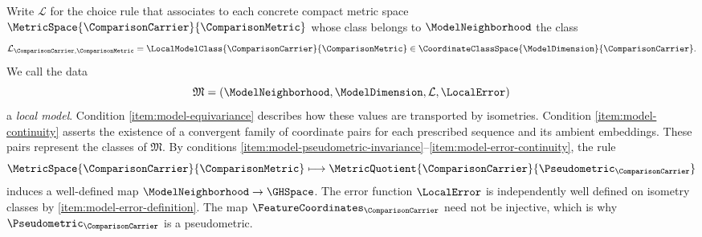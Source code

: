 Write
$\mathcal L$
for the choice rule that associates to each concrete compact metric space
$\MetricSpace{\ComparisonCarrier}{\ComparisonMetric}$
whose class belongs to
$\ModelNeighborhood$
the class
\[
 \mathcal L_{\ComparisonCarrier,\ComparisonMetric}
 =\LocalModelClass{\ComparisonCarrier}{\ComparisonMetric}
 \in\CoordinateClassSpace{\ModelDimension}{\ComparisonCarrier}.
\]
We call the data
\[
 \mathfrak M=(\ModelNeighborhood,\ModelDimension,\mathcal L,\LocalError)
\]
a \emph{local model}.
Condition \ref{item:model-equivariance} describes how these values are transported by isometries.
Condition \ref{item:model-continuity} asserts the existence of a convergent family of coordinate pairs
for each prescribed sequence and its ambient embeddings.
These pairs represent the classes of
$\mathfrak M$.
By conditions \ref{item:model-pseudometric-invariance}--\ref{item:model-error-continuity},
the rule
\[
 \MetricSpace{\ComparisonCarrier}{\ComparisonMetric}
 \longmapsto\MetricQuotient{\ComparisonCarrier}{\Pseudometric_\ComparisonCarrier}
\]
induces a well-defined map
$\ModelNeighborhood\to\GHSpace$.
The error function
$\LocalError$
is independently well defined on isometry classes by
\ref{item:model-error-definition}.
The map
$\FeatureCoordinates _\ComparisonCarrier $
need not be injective,
which is why
$\Pseudometric _\ComparisonCarrier $
is a pseudometric.

